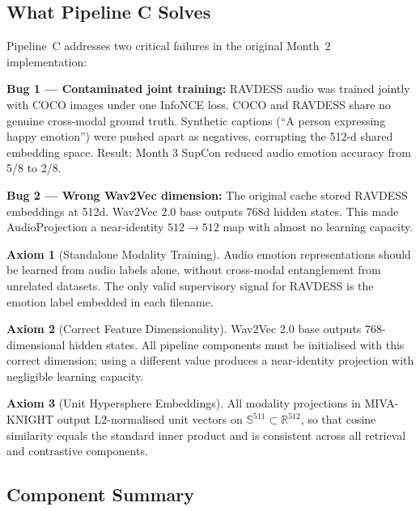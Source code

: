 \documentclass[12pt,a4paper]{article}
\theoremstyle{definition}
\newtheorem{axiom}{Axiom}[section]
\theoremstyle{plain}
\theoremstyle{remark}
\begin{document}
\subsection{What Pipeline C Solves}

Pipeline~C addresses two critical failures in the original Month~2 implementation:

\begin{tcolorbox}[notebox,title={Two Bugs Fixed by Pipeline C}]
\textbf{Bug 1 --- Contaminated joint training:} RAVDESS audio was trained jointly with
COCO images under one InfoNCE loss.  COCO and RAVDESS share no genuine cross-modal
ground truth.  Synthetic captions (``A person expressing happy emotion'') were pushed
apart as negatives, corrupting the 512-d shared embedding space.
Result: Month 3 SupCon reduced audio emotion accuracy from 5/8 to 2/8.

\textbf{Bug 2 --- Wrong Wav2Vec dimension:} The original cache stored RAVDESS
embeddings at 512d.  Wav2Vec 2.0 base outputs 768d hidden states.  This made
AudioProjection a near-identity $512\to512$ map with almost no learning capacity.
\end{tcolorbox}

\begin{axiom}[Standalone Modality Training]
Audio emotion representations should be learned from audio labels alone,
without cross-modal entanglement from unrelated datasets.  The only valid
supervisory signal for RAVDESS is the emotion label embedded in each filename.
\end{axiom}

\begin{axiom}[Correct Feature Dimensionality]
Wav2Vec 2.0 base outputs $768$-dimensional hidden states.  All pipeline components
must be initialised with this correct dimension; using a different value produces
a near-identity projection with negligible learning capacity.
\end{axiom}

\begin{axiom}[Unit Hypersphere Embeddings]
All modality projections in MIVA-KNIGHT output L2-normalised unit vectors on
$\mathbb{S}^{511} \subset \mathbb{R}^{512}$, so that cosine similarity equals
the standard inner product and is consistent across all retrieval and contrastive
components.
\end{axiom}

\subsection{Component Summary}
\end{document}
